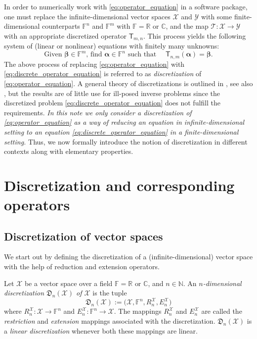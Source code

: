 \documentclass[a4paper]{paper}
\newcommand{\Discr}{\mathfrak{D}}
\newcommand{\Spc}[1]{\mathscr{#1}}
\newcommand{\Field}{\mathbb{F}}
\newcommand{\Real}{\mathbb{R}}
\newcommand{\Complex}{\mathbb{C}}
\newcommand{\Natural}{\mathbb{N}}
\newcommand{\Op}[1]{\mathcal{#1}}
\newcommand{\DiscOp}[1]{\mathsf{#1}}
\newcommand*{\EXT}[2]{\ensuremath{E_{#1}^{#2}}}
\newcommand*{\REST}[2]{\ensuremath{R_{#1}^{#2}}}
\newcommand*{\RnX}{\ensuremath{\REST{n}{\Spc{X}}}}
\newcommand*{\EnX}{\ensuremath{\EXT{n}{\Spc{X}}}}
\newcommand{\valpha}{\boldsymbol{\alpha}}
\newcommand{\vbeta}{\boldsymbol{\beta}}
\begin{document}
In order to numerically work with \eqref{eq:operator_equation} in a software package, one must replace the 
infinite-dimensional vector spaces $\Spc{X}$ and $\Spc{Y}$ with some finite-dimensional 
counterparts $\Field^{n}$ and $\Field^{m}$ with $\Field = \Real \text{ or } \Complex$, and the map 
$\Op{T} \colon \Spc{X} \to \Spc{Y}$ with an appropriate discretized operator 
$\DiscOp{T}_{m,n}$. This process yields the following system of (linear or nonlinear) equations
with finitely many unknowns:
%
\begin{equation}
 \label{eq:discrete_operator_equation}
 \text{Given $\vbeta \in \Field^{m}$, find $\valpha \in \Field^{n}$ such that }\quad \DiscOp{T}_{n,m} (\valpha)=\vbeta. 
\end{equation}
%
The above process of replacing \eqref{eq:operator_equation} with \eqref{eq:discrete_operator_equation} is referred to 
as \emph{discretization} of \eqref{eq:operator_equation}. A general theory of discretizations is outlined in 
\cite[Chapter~34]{ZeIIB85}, see also \cite{Pe93}, but the results are of little use for ill-posed inverse 
problems since the discretized problem \eqref{eq:discrete_operator_equation} does not fulfill the requirements.
\emph{In this note we only consider a discretization of \eqref{eq:operator_equation} 
as a way of reducing an equation in infinite-dimensional setting to an equation 
\eqref{eq:discrete_operator_equation} in a finite-dimensional setting.}
Thus, we now formally introduce the notion of discretization in different contexts along with elementary properties.


\section{Discretization and corresponding operators}
\label{sec:discretization_compatibility}

\subsection{Discretization of vector spaces}
\label{subsec:space_discretization}

We start out by defining the discretization of a (infinite-dimensional) vector space with the help of 
reduction and extension operators.

\begin{definition}
 \label{def:space_discretization}
 Let $\Spc{X}$ be a vector space over a field $\Field = \Real \text{ or } \Complex$, and $n \in \Natural$.
 An \emph{$n$-dimensional discretization $\Discr_{n}(\Spc{X})$ of $\Spc{X}$} is the tuple
 \begin{equation*}
  \Discr_{n}(\Spc{X}) := \bigl( \Spc{X}, \Field^{n}, \RnX, \EnX \bigr) 
 \end{equation*}
 where $\RnX \colon \Spc{X} \to \Field^{n}$ and $\EnX \colon \Field^{n} \to \Spc{X}$. The mappings $\RnX$ and $\EnX$ 
are called 
 the \emph{restriction} and \emph{extension} mappings associated with the discretization. $\Discr_n(\Spc{X})$ is a 
\emph{linear 
 discretization} whenever both these mappings are linear.
\end{definition}
\end{document}
